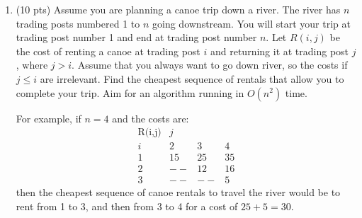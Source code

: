 \documentclass[11pt]{article}
\newtheorem*{solution}{Solution}
\begin{document}
\begin{enumerate}
\begin{enumerate}
\item (3 pts) First, find and justify a recurrence (with boundary conditions) giving the the optimal cost for completing the tasks.  Use $M(j)$ for the minimum cost required to do the first $j$ tasks.
\begin{solution}

\end{solution}
\newpage
\item (2 pts) Give an $O(n)$-time recursive algorithm with memoization for calculating the $M(j)$ values.

\begin{solution}

\end{solution}
\newpage

\item (1 pt) Give an $O(n)$-time bottom-up algorithm for filling in the array
\begin{solution}

\end{solution}
\newpage

\item (2 pts) Describe how to determine which tasks to do yourself, and which tasks to hire the handyman for in an optimal solution.
\begin{solution}

\end{solution}
\end{enumerate}

(optional challenge for the interested students, not to be turned in: solve the variant of the problem 
where the handyman can be used at cost $h$ to finish the last one, two, or three tasks on the list) 
\newpage

 \item (10 pts) Assume you are planning a canoe trip down a river.
The river has $n$ trading posts numbered 1 to $n$ going downstream.
You will start your trip at trading post number 1 and end at trading 
post number $n$.  
Let $R(i,j)$ be the cost of renting a canoe at trading post
$i$ and returning it at trading post $j$, where $j> i$.
Assume that you always want to go down river, so the costs if $j\leq i$ 
are irrelevant.  Find the cheapest sequence of rentals that 
allow you to complete your trip.
Aim for an algorithm running in $O(n^2)$ time.

For example, if $n=4$ and the costs are:
\[
\begin{array}{lccc} 
\mbox{R(i,j)} &  {j}  \\ 
{i} &   2 &   3 &   4 \\ \hline
1   &  15 &  25 &  35 \\
2   &  -- &  12 &  16 \\
3   &  -- & -- & 5
\end{array}
\]
then the cheapest sequence of canoe rentals to travel the river
would be to rent from 1 to 3, and then from 3 to 4 for a cost of $25+5=30$.


\end{enumerate}
\end{document}
